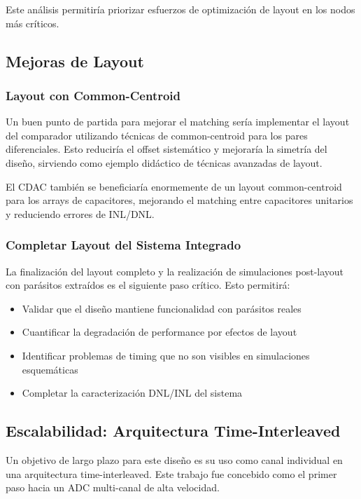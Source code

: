 \documentclass[12pt,a4paper]{report}
\begin{document}
Este análisis permitiría priorizar esfuerzos de optimización de layout en los nodos más críticos.

\subsection{Mejoras de Layout}

\subsubsection{Layout con Common-Centroid}

Un buen punto de partida para mejorar el matching sería implementar el layout del comparador utilizando técnicas de common-centroid para los pares diferenciales. Esto reduciría el offset sistemático y mejoraría la simetría del diseño, sirviendo como ejemplo didáctico de técnicas avanzadas de layout.

El CDAC también se beneficiaría enormemente de un layout common-centroid para los arrays de capacitores, mejorando el matching entre capacitores unitarios y reduciendo errores de INL/DNL.

\subsubsection{Completar Layout del Sistema Integrado}

La finalización del layout completo y la realización de simulaciones post-layout con parásitos extraídos es el siguiente paso crítico. Esto permitirá:
\begin{itemize}
    \item Validar que el diseño mantiene funcionalidad con parásitos reales
    \item Cuantificar la degradación de performance por efectos de layout
    \item Identificar problemas de timing que no son visibles en simulaciones esquemáticas
    \item Completar la caracterización DNL/INL del sistema
\end{itemize}

\subsection{Escalabilidad: Arquitectura Time-Interleaved}

Un objetivo de largo plazo para este diseño es su uso como canal individual en una arquitectura time-interleaved. Este trabajo fue concebido como el primer paso hacia un ADC multi-canal de alta velocidad.
\end{document}
